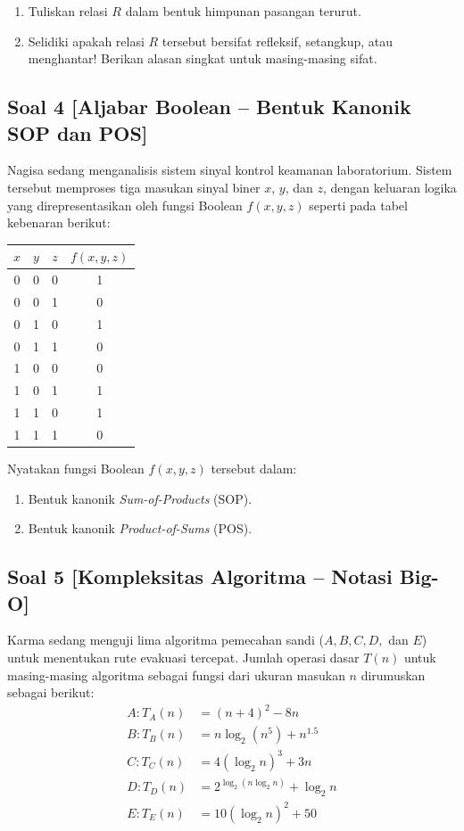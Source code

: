 \documentclass[12pt,a4paper]{article}
\begin{document}
\begin{enumerate}[label=(\alph*)]
    \item Tuliskan relasi $R$ dalam bentuk himpunan pasangan terurut.
    \item Selidiki apakah relasi $R$ tersebut bersifat refleksif, setangkup, atau menghantar! Berikan alasan singkat untuk masing-masing sifat.
\end{enumerate}

\subsection*{Soal 4 [Aljabar Boolean -- Bentuk Kanonik SOP dan POS]}
Nagisa sedang menganalisis sistem sinyal kontrol keamanan laboratorium. Sistem tersebut memproses tiga masukan sinyal biner $x$, $y$, dan $z$, dengan keluaran logika yang direpresentasikan oleh fungsi Boolean $f(x, y, z)$ seperti pada tabel kebenaran berikut:

\begin{center}
\begin{tabular}{|c|c|c|c|}
\hline
$x$ & $y$ & $z$ & $f(x, y, z)$ \\ \hline
0 & 0 & 0 & 1 \\
0 & 0 & 1 & 0 \\
0 & 1 & 0 & 1 \\
0 & 1 & 1 & 0 \\
1 & 0 & 0 & 0 \\
1 & 0 & 1 & 1 \\
1 & 1 & 0 & 1 \\
1 & 1 & 1 & 0 \\ \hline
\end{tabular}
\end{center}

Nyatakan fungsi Boolean $f(x, y, z)$ tersebut dalam:
\begin{enumerate}[label=(\alph*)]
    \item Bentuk kanonik \textit{Sum-of-Products} (SOP).
    \item Bentuk kanonik \textit{Product-of-Sums} (POS).
\end{enumerate}

\subsection*{Soal 5 [Kompleksitas Algoritma -- Notasi Big-O]}
Karma sedang menguji lima algoritma pemecahan sandi ($A, B, C, D,$ dan $E$) untuk menentukan rute evakuasi tercepat. Jumlah operasi dasar $T(n)$ untuk masing-masing algoritma sebagai fungsi dari ukuran masukan $n$ dirumuskan sebagai berikut:
\begin{align*}
    A: T_A(n) &= (n + 4)^2 - 8n \\
    B: T_B(n) &= n \log_2(n^5) + n^{1.5} \\
    C: T_C(n) &= 4(\log_2 n)^3 + 3n \\
    D: T_D(n) &= 2^{\log_2(n \log_2 n)} + \log_2 n \\
    E: T_E(n) &= 10(\log_2 n)^2 + 50
\end{align*}
\end{document}
